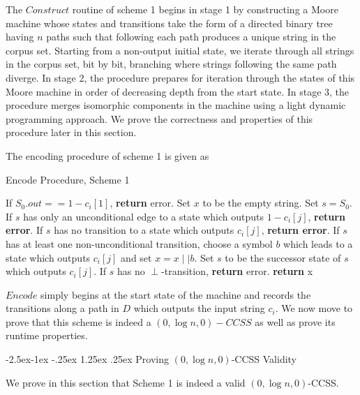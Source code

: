 \documentclass{article}
\makeatletter
\renewcommand\paragraph{\@startsection{paragraph}{4}{\z@}%
            {-2.5ex\@plus -1ex \@minus -.25ex}%
            {1.25ex \@plus .25ex}%
            {\normalfont\normalsize\bfseries}}
\theoremstyle{definition}
\makeatother
\begin{document}
\noindent The $Construct$ routine of scheme 1 begins in stage 1 by constructing a 
Moore machine whose states and transitions take the form of a directed 
binary tree having $n$ paths such that following each path 
produces a unique string in the corpus set.  Starting from a non-output initial state, we iterate through all strings in the corpus set, bit by bit, branching where 
strings following the same path diverge.  In stage 2, the procedure 
prepares for iteration through the states of this Moore machine in order 
of decreasing depth from the start state.  In stage 3, the procedure 
merges isomorphic components in the machine using a light dynamic programming 
approach.  We prove the correctness and properties of this procedure later 
in this section.

The encoding procedure of scheme 1 is given as   

\begin{algorithm}[H]
\caption{Encode Procedure, Scheme 1}\label{AMMDecode}
\begin{algorithmic}[1]
\State If $S_0.out == 1 - c_i[1]$, \textbf{return} error.
\State Set $x$ to be the empty string.
\State Set $s=S_0$.
\State If $s$ has only an unconditional edge to a state which outputs 
$1-c_i[j]$, \textbf{return error}.
\State If $s$ has no transition to a state which outputs $c_i[j]$, 
\textbf{return error}.
\State If $s$ has at least one non-unconditional transition, 
choose a symbol $b$ which leads to a state which outputs $c_i[j]$ 
and set $x = x \mid \mid b$.
\State Set $s$ to be the successor state of $s$ which outputs $c_i[j]$.
\EndFor
\State If $s$ has no $\perp$-transition, \textbf{return} error.
\State \textbf{return} x
\EndProcedure
\end{algorithmic}
\end{algorithm}

\noindent $Encode$ simply begins at the start state of the machine and
records the transitions along a path in $D$ which outputs the input 
string $c_i$.  We now move to prove that this scheme is indeed a 
$(0, \log{n}, 0)-CCSS$ as well as prove its runtime properties.

\paragraph{Proving $(0,\log{n},0)$-CCSS Validity}

We prove in this section that Scheme 1 is indeed a valid 
$(0, \log{n}, 0)$-CCSS.
\end{document}
